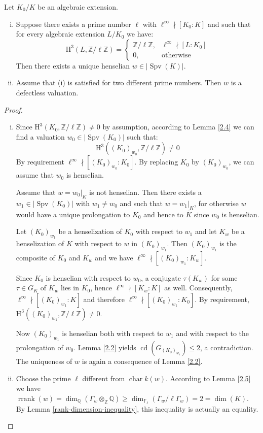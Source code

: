\begin{proposition}\label{2.6}
Let $K_0/K$ be an algebraic extension.
\begin{enumerate}[(i)]
\item Suppose there exists a prime number $\ell$ with $\ell^\infty\nmid[K_0:K]$ and such that for every algebraic extension $L/K_0$ we have: 
\[ \mathrm{H}^3(L,\mathbb{Z}/\ell\mathbb{Z}) = \begin{cases}
\mathbb{Z}/\ell\mathbb{Z}, & \ell^\infty\nmid [L:K_0]\\
0, & \text{otherwise}
\end{cases} \]
Then there exists a unique henselian $w\in|\operatorname{Spv}(K)|$.
\item Assume that (i) is satisfied for two different prime numbers. Then $w$ is a defectless valuation.
\end{enumerate}
\end{proposition}

\begin{proof}
\begin{enumerate}[(i)]
\item Since $\mathrm{H}^3(K_0, \mathbb{Z}/\ell\mathbb{Z})\neq 0$ by assumption, according to Lemma \ref{2.4} we can find a valuation $w_0\in|\operatorname{Spv}(K_0)|$ such that:
\[ \mathrm{H}^3((K_0)_{w_0}, \mathbb{Z}/\ell\mathbb{Z}) \neq 0 \]
By requirement $\ell^\infty \nmid [(K_0)_{w_0} : K_0]$. By replacing $K_0$ by $(K_0)_{w_0}$, we can assume that $w_0$ is henselian.

Assume that $w = w_0|_K$ is not henselian. Then there exists a $w_1\in|\operatorname{Spv}(K_0)|$ with $w_1\neq w_0$ and such that $w = w_1|_K$, for otherwise $w$ would have a unique prolongation to $K_0$ and hence to $\overline{K}$ since $w_0$ is henselian.

Let $(K_0)_{w_1}$ be a henselization of $K_0$ with respect to $w_1$ and let $K_w$ be a henselization of $K$ with respect to $w$ in $(K_0)_{w_1}$. Then $(K_0)_{w_1}$ is the composite of $K_0$ and $K_w$ and we have $\ell^\infty\nmid [(K_0)_{w_1} : K_w]$.

Since $K_0$ is henselian with respect to $w_0$, a conjugate $\tau(K_w)$ for some $\tau\in G_K$ of $K_w$ lies in $K_0$, hence $\ell^\infty\nmid [K_w : K]$ as well. Consequently, $\ell^\infty \nmid [(K_0)_{w_1} : K]$ and therefore $\ell^\infty \nmid [(K_0)_{w_1} : K_0]$. By requirement, $\mathrm{H}^3((K_0)_{w_1}, \mathbb{Z}/\ell\mathbb{Z}) \neq 0$.

Now $(K_0)_{w_1}$ is henselian both with respect to $w_1$ and with respect to the prolongation of $w_0$. Lemma \ref{2.2} yields $\operatorname{cd}(G_{(K_0)_{w_1}})\leq 2$, a contradiction. The uniqueness of $w$ is again a consequence of Lemma \ref{2.2}.
\item Choose the prime $\ell$ different from $\operatorname{char} k(w)$. According to Lemma \ref{2.5} we have $\operatorname{rrank}(w)=\dim_\mathbb{Q}(\Gamma_w\otimes_\mathbb{Z}\mathbb{Q} )\geq \dim_{\mathbb{F}_\ell}(\Gamma_w /\ell\Gamma_w) = 2 = \dim(K)$. By Lemma \ref{rank-dimension-inequality}, this inequality is actually an equality.
\end{enumerate}
\end{proof}

